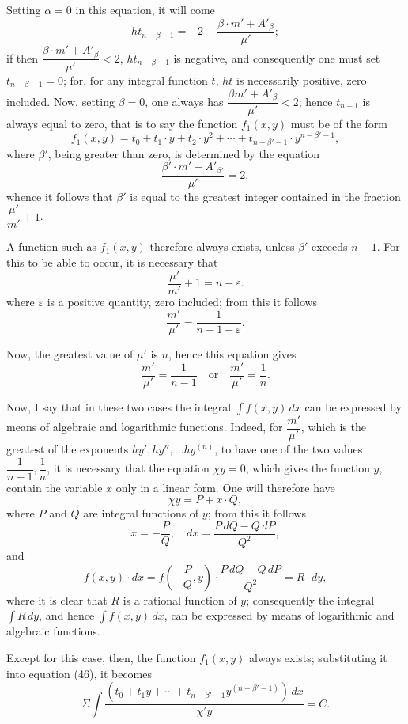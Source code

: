 \documentclass{article}
\begin{document}
Setting $\alpha = 0$ in this equation, it will come
\[ ht_{n-\beta-1} = -2 + \frac{\beta \cdot m' + A'_\beta}{\mu'}; \]
if then $\dfrac{\beta \cdot m' + A'_\beta}{\mu'} < 2$, $ht_{n-\beta-1}$ is negative, and consequently one must set $t_{n-\beta-1} = 0$; for, for any integral function $t$, $ht$ is necessarily positive, zero included. Now, setting $\beta = 0$, one always has $\dfrac{\beta m' + A'_\beta}{\mu'} < 2$; hence $t_{n-1}$ is always equal to zero, that is to say the function $f_1(x, y)$ must be of the form
\[ f_1(x, y) = t_0 + t_1 \cdot y + t_2 \cdot y^{2} + \cdots + t_{n-\beta'-1} \cdot y^{n-\beta'-1}, \tag{58} \]
where $\beta'$, being greater than zero, is determined by the equation
\[ \frac{\beta' \cdot m' + A'_{\beta'}}{\mu'} = 2, \]
whence it follows that $\beta'$ is equal to the greatest integer contained in the fraction $\dfrac{\mu'}{m'} + 1$.

A function such as $f_1(x, y)$ therefore always exists, unless $\beta'$ exceeds $n-1$. For this to be able to occur, it is necessary that
\[ \frac{\mu'}{m'} + 1 = n + \varepsilon. \]
where $\varepsilon$ is a positive quantity, zero included; from this it follows
\[ \frac{m'}{\mu'} = \frac{1}{n-1+\varepsilon}. \]

Now, the greatest value of $\mu'$ is $n$, hence this equation gives
\[ \frac{m'}{\mu'} = \frac{1}{n-1} \quad \text{or} \quad \frac{m'}{\mu'} = \frac{1}{n}. \]

Now, I say that in these two cases the integral $\displaystyle\int f(x, y)\,dx$ can be expressed by means of algebraic and logarithmic functions. Indeed, for $\dfrac{m'}{\mu'}$, which is the greatest of the exponents $hy', hy'', \ldots hy^{(n)}$, to have one of the two values $\dfrac{1}{n-1}, \dfrac{1}{n}$, it is necessary that the equation $\chi y = 0$, which gives the function $y$, contain the variable $x$ only in a linear form. One will therefore have
\[ \chi y = P + x \cdot Q, \]
where $P$ and $Q$ are integral functions of $y$; from this it follows
\[ x = -\frac{P}{Q}, \quad dx = \frac{P\,dQ - Q\,dP}{Q^{2}}, \]
and
\[ f(x, y) \cdot dx = f\left(-\frac{P}{Q}, y\right) \cdot \frac{P\,dQ - Q\,dP}{Q^{2}} = R \cdot dy, \]
where it is clear that $R$ is a rational function of $y$; consequently the integral $\displaystyle\int R\,dy$, and hence $\displaystyle\int f(x, y)\,dx$, can be expressed by means of logarithmic and algebraic functions.

Except for this case, then, the function $f_1(x, y)$ always exists; substituting it into equation (46), it becomes
\[ \Sigma\int \frac{(t_0 + t_1 y + \cdots + t_{n-\beta'-1} y^{(n-\beta'-1)})\,dx}{\chi' y} = C. \tag{59} \]
\end{document}
